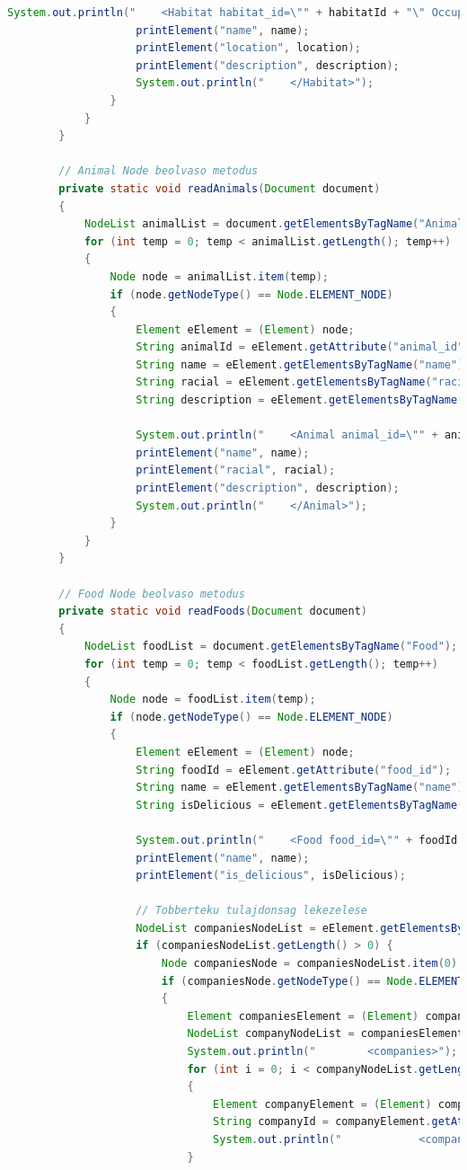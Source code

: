 \documentclass[12pt]{report}
\begin{document}
\begin{lstlisting}[caption={DOMReadKLNSPG.java} adatolvasó program, language=Java]
					System.out.println("    <Habitat habitat_id=\"" + habitatId + "\" Occupy=\"" + occupy + "\">");
					printElement("name", name);
					printElement("location", location);
					printElement("description", description);
					System.out.println("    </Habitat>");
				}
			}
		}
		
		// Animal Node beolvaso metodus
		private static void readAnimals(Document document) 
		{
			NodeList animalList = document.getElementsByTagName("Animal");
			for (int temp = 0; temp < animalList.getLength(); temp++) 
			{
				Node node = animalList.item(temp);
				if (node.getNodeType() == Node.ELEMENT_NODE) 
				{
					Element eElement = (Element) node;
					String animalId = eElement.getAttribute("animal_id");
					String name = eElement.getElementsByTagName("name").item(0).getTextContent();
					String racial = eElement.getElementsByTagName("racial").item(0).getTextContent();
					String description = eElement.getElementsByTagName("description").item(0).getTextContent();
					
					System.out.println("    <Animal animal_id=\"" + animalId + "\">");
					printElement("name", name);
					printElement("racial", racial);
					printElement("description", description);
					System.out.println("    </Animal>");
				}
			}
		}
		
		// Food Node beolvaso metodus
		private static void readFoods(Document document) 
		{
			NodeList foodList = document.getElementsByTagName("Food");
			for (int temp = 0; temp < foodList.getLength(); temp++) 
			{
				Node node = foodList.item(temp);
				if (node.getNodeType() == Node.ELEMENT_NODE) 
				{
					Element eElement = (Element) node;
					String foodId = eElement.getAttribute("food_id");
					String name = eElement.getElementsByTagName("name").item(0).getTextContent();
					String isDelicious = eElement.getElementsByTagName("is_delicious").item(0).getTextContent();
					
					System.out.println("    <Food food_id=\"" + foodId + "\">");
					printElement("name", name);
					printElement("is_delicious", isDelicious);
					
					// Tobberteku tulajdonsag lekezelese
					NodeList companiesNodeList = eElement.getElementsByTagName("companies");
					if (companiesNodeList.getLength() > 0) {
						Node companiesNode = companiesNodeList.item(0);
						if (companiesNode.getNodeType() == Node.ELEMENT_NODE) 
						{
							Element companiesElement = (Element) companiesNode;
							NodeList companyNodeList = companiesElement.getElementsByTagName("company");
							System.out.println("        <companies>");
							for (int i = 0; i < companyNodeList.getLength(); i++) 
							{
								Element companyElement = (Element) companyNodeList.item(i);
								String companyId = companyElement.getAttribute("id");
								System.out.println("            <company id=\"" + companyId + "\">" + companyElement.getTextContent() + "</company>");
							}
							

\end{lstlisting}
\end{document}

